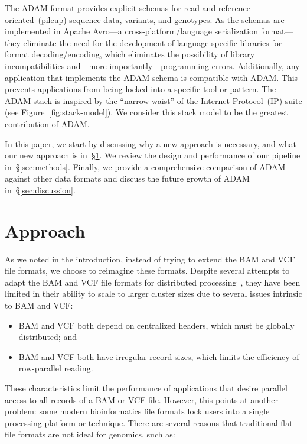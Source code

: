 \documentclass{bioinfo}
\begin{document}
The ADAM format provides explicit schemas for read and reference oriented~(pileup) sequence data, variants, and genotypes. As the schemas are implemented in Apache
Avro---a cross-platform/language serialization format---they eliminate the need for the development of language-specific libraries for format decoding/encoding, which
eliminates the possibility of library incompatibilities and---more importantly---programming errors. Additionally, any application that implements the ADAM schema is
compatible with ADAM. This prevents applications from being locked into a specific tool or pattern. The ADAM stack is inspired by the ``narrow waist'' of the Internet
Protocol~(IP) suite (see Figure~\ref{fig:stack-model}). We consider this stack model to be the greatest contribution of ADAM.

In this paper, we start by discussing why a new approach is necessary, and what our new approach is in~\S\ref{sec:approach}. We review the
design and performance of our pipeline in~\S\ref{sec:methods}. Finally, we provide a comprehensive comparison of
ADAM against other data formats and discuss the future growth of ADAM in~\S\ref{sec:discussion}.

\section{Approach}
\label{sec:approach}

As we noted in the introduction, instead of trying to extend the BAM and VCF file formats, we choose to reimagine these formats. Despite several attempts to adapt the
BAM and VCF file formats for distributed processing~\citep[see][]{niemenmaa12}, they have been limited in their ability to scale to larger cluster sizes due to several issues
intrinsic to BAM and VCF:

\begin{itemize}
\item BAM and VCF both depend on centralized headers, which must be globally distributed; and
\item BAM and VCF both have irregular record sizes, which limits the efficiency of row-parallel reading. 
\end{itemize}

These characteristics limit the performance of applications that desire parallel access to all records of a BAM or VCF file. However,
this points at another problem: some modern bioinformatics file formats lock users into a single processing platform or technique. There are
several reasons that traditional flat file formats are not ideal for genomics, such as:
\end{document}

